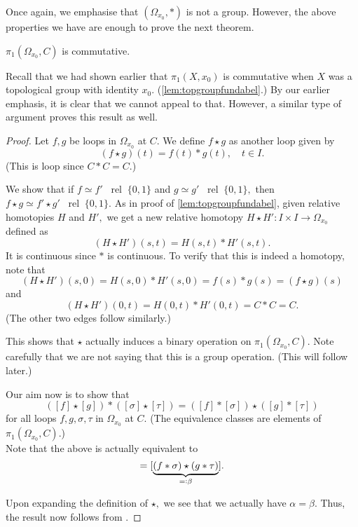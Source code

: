 \documentclass[12pt]{article}
\newcommand{\rel}{\;\;\operatorname{rel}\;}
\begin{document}
Once again, we emphasise that $(\Omega_{x_0}, *)$ is not a group. However, the above properties we have are enough to prove the next theorem.

\begin{thm}
	$\pi_1(\Omega_{x_0}, C)$ is commutative.	
\end{thm}

Recall that we had shown earlier that $\pi_1(X, x_0)$ is commutative when $X$ was a topological group with identity $x_0.$ (\cref{lem:topgroupfundabel}.) By our earlier emphasis, it is clear that we cannot appeal to that. However, a similar type of argument proves this result as well.

\begin{proof} 
	Let $f, g$ be loops in $\Omega_{x_0}$ at $C.$ We define $f\star g$ as another loop given by
	\begin{equation*} 
		(f\star g)(t) = f(t)*g(t), \quad t \in I.
	\end{equation*}
	(This is loop since $C*C = C.$)

	We show that if $f\simeq f'\rel\{0, 1\}$ and $g\simeq g'\rel\{0, 1\},$ then $f\star g \simeq f'\star g' \rel\{0, 1\}.$ As in proof of \cref{lem:topgroupfundabel}, given relative homotopies $H$ and $H',$ we get a new relative homotopy $H\star H':I\times I \to \Omega_{x_0}$ defined as
	\begin{equation*} 
		(H\star H')(s, t) = H(s, t)*H'(s, t).
	\end{equation*}
	It is continuous since $*$ is continuous. To verify that this is indeed a homotopy, note that 
	\begin{equation*} 
		(H\star H')(s, 0) = H(s, 0)*H'(s, 0) = f(s)*g(s) = (f\star g)(s)
	\end{equation*}
	and
	\begin{equation*} 
		(H\star H')(0, t) = H(0, t)*H'(0, t) = C*C = C.
	\end{equation*}
	(The other two edges follow similarly.)

	This shows that $\star$ actually induces a binary operation on $\pi_1(\Omega_{x_0}, C).$ Note carefully that we are not saying that this is a group operation. (This will follow later.)

	Our aim now is to show that
	\begin{equation*} 
		([f] \star [g]) * ([\sigma] \star [\tau]) = ([f] * [\sigma]) \star ([g] * [\tau])
	\end{equation*}
	for all loops $f, g, \sigma, \tau$ in $\Omega_{x_0}$ at $C.$ (The equivalence classes are elements of $\pi_1(\Omega_{x_0}, C).$)\\
	Note that the above is actually equivalent to
	\begin{equation*} 
		[\underbrace{(f \star g)*(\sigma \star \tau)}_{=\vcentcolon \alpha}] = [\underbrace{(f * \sigma) \star (g * \tau)}_{=\vcentcolon\beta}].
	\end{equation*}

	Upon expanding the definition of $\star,$ we see that we actually have $\alpha = \beta.$ Thus, the result now follows from .
\end{proof}
\end{document}
